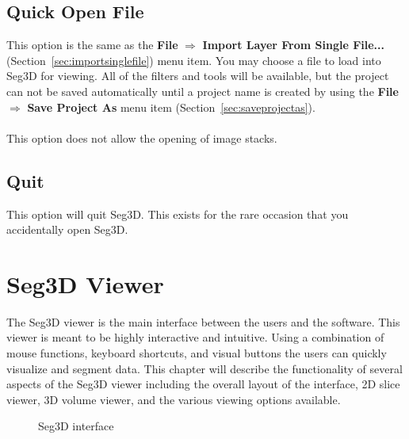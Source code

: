 \documentclass[fleqn,11pt,openany]{book}
\begin{document}
\section{Quick Open File}

This option is the same as the \textbf{File} $\Rightarrow$ \textbf{Import Layer From Single File...} (Section~\ref{sec:importsinglefile}) menu item.
You may choose a file to load into Seg3D for viewing.
All of the filters and tools will be available, but the project can not be saved automatically until a project name is created by using the \textbf{File} $\Rightarrow$ \textbf{Save Project As} menu item (Section~\ref{sec:saveprojectas}). 
\\
\\
This option does not allow the opening of image stacks.

\section{Quit}

This option will quit Seg3D.  This exists for the rare occasion that you accidentally open Seg3D.  



\chapter{Seg3D Viewer}
\label{sec:viewer}

\begin{introduction}
The Seg3D viewer is the main interface between the users and the software.  This viewer is meant to be highly interactive and intuitive.
Using a combination of mouse functions, keyboard shortcuts, and visual buttons the users can quickly visualize and segment data.
This chapter will describe the functionality of several aspects of the Seg3D viewer including the overall layout of the interface, 2D slice viewer, 3D volume viewer, and the various viewing options available.
\end{introduction}



\begin{figure}[h!]
\caption{Seg3D interface}\label{fig:blank}
\end{figure}
\end{document}
